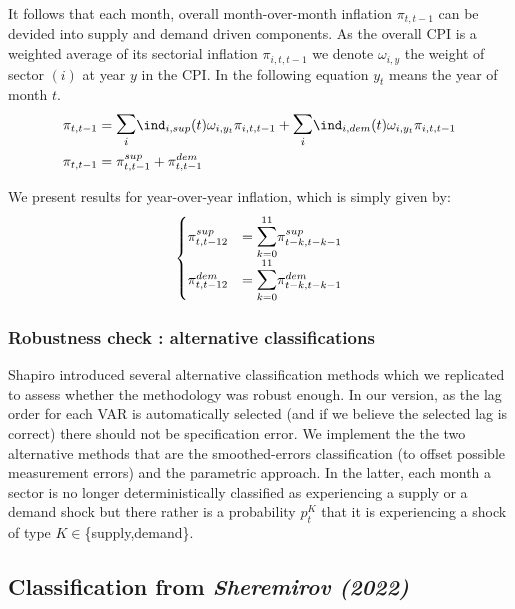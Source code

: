 It follows that each month, overall month-over-month inflation $\pi_{t,t-1}$ can be devided into supply and demand driven components. 
As the overall CPI is a weighted average of its sectorial inflation $\pi_{i,t,t-1}$ we denote $\omega_{i,y}$ the weight of sector $(i)$ at year $y$ in the CPI.
In the following equation $y_t$ means the year of month $t$.
\begin{align*}
    \pi_{t,t-1} &= \mathlarger{\mathlarger{\sum}}_{i} \ind_{i,sup}(t) \omega_{i,y_t} \pi_{i,t,t-1} + \mathlarger{\mathlarger{\sum}}_{i} \ind_{i,dem}(t) \omega_{i,y_t} \pi_{i,t,t-1} \\
    \pi_{t,t-1} &= \pi_{t,t-1}^{sup} + \pi_{t,t-1}^{dem}
\end{align*}

We present results for year-over-year inflation, which is simply given by:
\begin{align*}
    \begin{cases}
        \pi_{t,t-12}^{sup} &= \mathlarger{\mathlarger{\sum}}_{k=0}^{11} \pi_{t-k,t-k-1}^{sup} \\
        \pi_{t,t-12}^{dem} &= \mathlarger{\mathlarger{\sum}}_{k=0}^{11} \pi_{t-k,t-k-1}^{dem}
    \end{cases}
\end{align*}

\subsubsection{Robustness check : alternative classifications}

\quad Shapiro introduced several alternative classification methods which we replicated to assess whether the methodology was robust enough.
In our version, as the lag order for each VAR is automatically selected (and if we believe the selected lag is correct) there should not be specification error.
\bigbreak
We implement the the two alternative methods that are the smoothed-errors classification (to offset possible measurement errors) and the parametric approach. 
In the latter, each month a sector is no longer deterministically classified as experiencing a supply or a demand shock but there rather is a probability $p_t^K$ that it is experiencing a shock of type $K \in$\{supply,demand\}.


\subsection{Classification from \textit{Sheremirov (2022)}}

